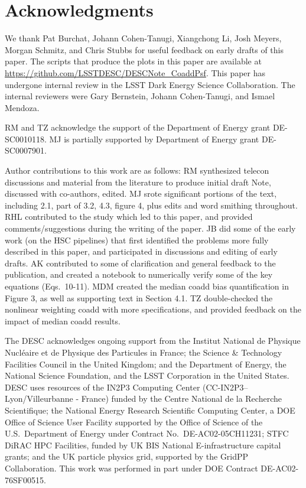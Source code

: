 \documentclass{aastex63}
\newcommand{\irresponse}[1]{{#1}}
\begin{document}
\section*{Acknowledgments}

We thank Pat Burchat, Johann Cohen-Tanugi, Xiangchong Li, Josh Meyers, Morgan Schmitz, and Chris Stubbs for useful feedback on early  drafts of this paper. The scripts that produce the plots in this paper are available at \url{https://github.com/LSSTDESC/DESCNote_CoaddPsf}.  This paper has undergone internal review in the LSST Dark Energy Science Collaboration. The internal reviewers were \irresponse{Gary Bernstein, Johann Cohen-Tanugi, and Ismael Mendoza.}

RM and TZ acknowledge the support of the Department of Energy grant DE-SC0010118.
MJ is partially supported by
Department of Energy grant DE-SC0007901.

Author contributions to this work are as follows: RM synthesized telecon discussions and material from the literature to produce initial draft Note, discussed with co-authors, edited.  MJ srote significant portions of the text, including 2.1, part of 3.2, 4.3, figure 4, plus edits and word smithing throughout.  RHL contributed to the study which led to this paper, and provided comments/suggestions during the writing of the paper. JB did some of the early work (on the HSC pipelines) that first identified the problems more fully described in this paper, and participated in discussions and editing of early drafts.  AK contributed to some of clarification and general feedback to the publication, and created a notebook to numerically verify some of the key equations (Eqs.\ 10-11). MDM created the median coadd bias quantification in Figure 3, as well as supporting text in Section 4.1. TZ double-checked the nonlinear weighting coadd with more specifications, and provided feedback on the impact of median coadd results.

The DESC acknowledges ongoing support from the Institut National de 
Physique Nucl\'eaire et de Physique des Particules in France; the 
Science \& Technology Facilities Council in the United Kingdom; and the
Department of Energy, the National Science Foundation, and the LSST 
Corporation in the United States.  DESC uses resources of the IN2P3 
Computing Center (CC-IN2P3--Lyon/Villeurbanne - France) funded by the 
Centre National de la Recherche Scientifique; the National Energy 
Research Scientific Computing Center, a DOE Office of Science User 
Facility supported by the Office of Science of the U.S.\ Department of
Energy under Contract No.\ DE-AC02-05CH11231; STFC DiRAC HPC Facilities, 
funded by UK BIS National E-infrastructure capital grants; and the UK 
particle physics grid, supported by the GridPP Collaboration.  This 
work was performed in part under DOE Contract DE-AC02-76SF00515.


  
\end{document}
